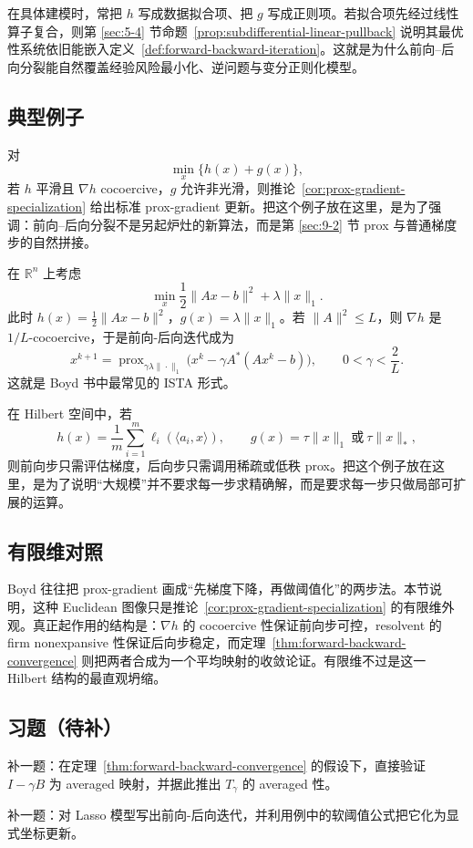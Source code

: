 \begin{remark}
在具体建模时，常把 $h$ 写成数据拟合项、把 $g$ 写成正则项。若拟合项先经过线性算子复合，则第 \ref{sec:5-4} 节命题~\ref{prop:subdifferential-linear-pullback} 说明其最优性系统依旧能嵌入定义~\ref{def:forward-backward-iteration}。这就是为什么前向--后向分裂能自然覆盖经验风险最小化、逆问题与变分正则化模型。
\end{remark}

\subsection{典型例子}

\begin{example}[$f+g$ 型凸最小化]
对
\[
\min_x \{h(x)+g(x)\},
\]
若 $h$ 平滑且 $\nabla h$ cocoercive，$g$ 允许非光滑，则推论~\ref{cor:prox-gradient-specialization} 给出标准 prox-gradient 更新。把这个例子放在这里，是为了强调：前向--后向分裂不是另起炉灶的新算法，而是第 \ref{sec:9-2} 节 prox 与普通梯度步的自然拼接。
\end{example}

\begin{example}
在 $\mathbb R^n$ 上考虑
\[
\min_x \frac{1}{2}\|Ax-b\|^2+\lambda \|x\|_1.
\]
此时 $h(x)=\frac12\|Ax-b\|^2$，$g(x)=\lambda\|x\|_1$。若 $\|A\|^2\le L$，则 $\nabla h$ 是 $1/L$-cocoercive，于是前向-后向迭代成为
\[
x^{k+1}
=
\operatorname{prox}_{\gamma\lambda\|\cdot\|_1}
\bigl(x^k-\gamma A^\ast(Ax^k-b)\bigr),
\qquad 0<\gamma<\frac{2}{L}.
\]
这就是 Boyd 书中最常见的 ISTA 形式。
\end{example}

\begin{example}[带正则项的经验风险最小化]
在 Hilbert 空间中，若
\[
h(x)=\frac{1}{m}\sum_{i=1}^m \ell_i(\langle a_i,x\rangle),
\qquad
g(x)=\tau \|x\|_1 \ \text{或}\ \tau\|x\|_\ast,
\]
则前向步只需评估梯度，后向步只需调用稀疏或低秩 prox。把这个例子放在这里，是为了说明“大规模”并不要求每一步求精确解，而是要求每一步只做局部可扩展的运算。
\end{example}

\subsection*{有限维对照}

Boyd 往往把 prox-gradient 画成“先梯度下降，再做阈值化”的两步法。本节说明，这种 Euclidean 图像只是推论~\ref{cor:prox-gradient-specialization} 的有限维外观。真正起作用的结构是：$\nabla h$ 的 cocoercive 性保证前向步可控，resolvent 的 firm nonexpansive 性保证后向步稳定，而定理~\ref{thm:forward-backward-convergence} 则把两者合成为一个平均映射的收敛论证。有限维不过是这一 Hilbert 结构的最直观坍缩。

\subsection*{习题（待补）}

\begin{exercise}[平均映射验证占位]
补一题：在定理~\ref{thm:forward-backward-convergence} 的假设下，直接验证 $I-\gamma B$ 为 averaged 映射，并据此推出 $T_\gamma$ 的 averaged 性。
\end{exercise}

\begin{exercise}
补一题：对 Lasso 模型写出前向-后向迭代，并利用例中的软阈值公式把它化为显式坐标更新。
\end{exercise}
